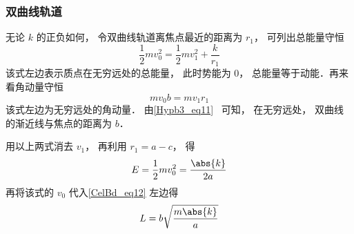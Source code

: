 \subsubsection{双曲线轨道}
无论 $k$ 的正负如何， 令双曲线轨道离焦点最近的距离为 $r_1$， 可列出总能量守恒
\begin{equation}\label{CelBd_eq11}
\frac12 mv_0^2 = \frac12 mv_1^2 + \frac{k}{r_1}
\end{equation}
该式左边表示质点在无穷远处的总能量， 此时势能为 $0$， 总能量等于动能．再来看角动量守恒
\begin{equation}\label{CelBd_eq12}
m v_0 b = m v_1 r_1
\end{equation}
该式左边为无穷远处的角动量． 由\autoref{Hypb3_eq11}~ 可知， 在无穷远处， 双曲线的渐近线与焦点的距离为 $b$．

用以上两式消去 $v_1$， 再利用 $r_1 = a - c$， 得
\begin{equation}\label{CelBd_eq13}
E = \frac 12 m v_0^2 = \frac{\abs{k}}{2a}
\end{equation}
再将该式的 $v_0$ 代入\autoref{CelBd_eq12} 左边得
\begin{equation}
L = b\sqrt{\frac{m\abs{k}}{a}}
\end{equation}
